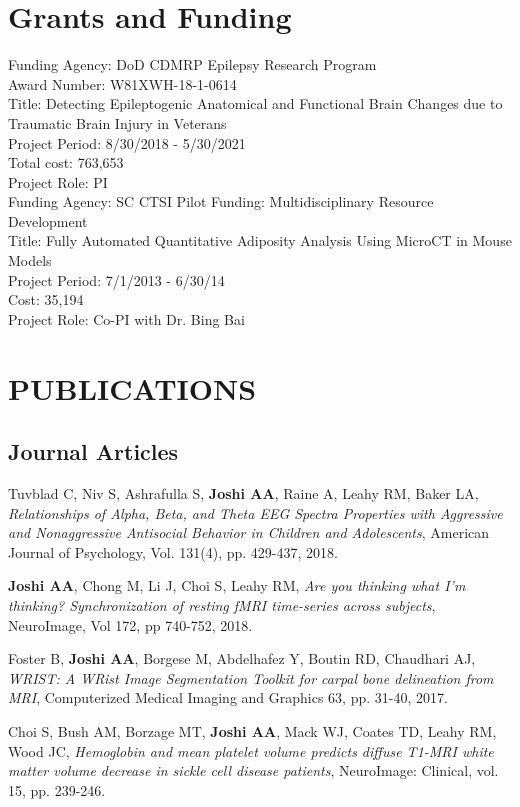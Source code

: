 \documentclass[overlapped,line,letterpaper]{res}
\begin{document}
\begin{resume}
\section{Grants and Funding}

Funding Agency: DoD CDMRP Epilepsy Research Program \\
Award Number: W81XWH-18-1-0614 \\
Title: Detecting Epileptogenic Anatomical and Functional Brain Changes
due to Traumatic Brain Injury in Veterans \\
Project Period: 8/30/2018 - 5/30/2021\\
Total cost: 763,653\\
Project Role: PI\\

Funding Agency: SC CTSI Pilot Funding: Multidisciplinary Resource Development\\
Title: Fully Automated Quantitative Adiposity Analysis Using MicroCT in Mouse Models\\
Project Period: 7/1/2013 - 6/30/14\\
Cost: 35,194 \\
Project Role: Co-PI with Dr. Bing Bai\\

\section{\bf PUBLICATIONS}
\subsection{Journal Articles}

Tuvblad C, Niv S, Ashrafulla S, \textbf{Joshi AA}, Raine A, Leahy RM, Baker LA, \textit{Relationships of Alpha, Beta, and Theta EEG Spectra Properties with Aggressive and Nonaggressive Antisocial Behavior in Children and Adolescents}, American Journal of Psychology, Vol. 131(4), pp. 429-437, 2018.

\textbf{Joshi AA}, Chong M, Li J, Choi S, Leahy RM, \textit{Are you thinking what I'm thinking? Synchronization of resting fMRI time-series across subjects}, NeuroImage, Vol 172, pp 740-752, 2018.

Foster B, \textbf{Joshi AA}, Borgese M, Abdelhafez Y, Boutin RD, Chaudhari AJ, \textit{WRIST: A WRist Image Segmentation Toolkit for carpal bone delineation from MRI}, Computerized Medical Imaging and Graphics 63, pp. 31-40, 2017.

Choi S, Bush AM, Borzage MT, \textbf{Joshi AA}, Mack WJ, Coates TD, Leahy RM, Wood JC, \textit{Hemoglobin and mean platelet volume predicts diffuse T1-MRI white matter volume decrease in sickle cell disease patients}, NeuroImage: Clinical, vol. 15, pp. 239-246. 


\end{resume}
\end{document}
